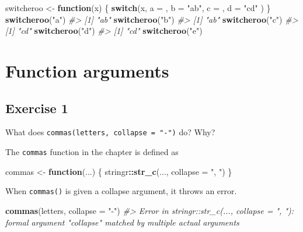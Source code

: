 \documentclass[]{book}
\newenvironment{Shaded}{\begin{snugshade}}{\end{snugshade}}
\newcommand{\CommentTok}[1]{\textcolor[rgb]{0.56,0.35,0.01}{\textit{#1}}}
\newcommand{\ControlFlowTok}[1]{\textcolor[rgb]{0.13,0.29,0.53}{\textbf{#1}}}
\newcommand{\DataTypeTok}[1]{\textcolor[rgb]{0.13,0.29,0.53}{#1}}
\newcommand{\KeywordTok}[1]{\textcolor[rgb]{0.13,0.29,0.53}{\textbf{#1}}}
\newcommand{\NormalTok}[1]{#1}
\newcommand{\OperatorTok}[1]{\textcolor[rgb]{0.81,0.36,0.00}{\textbf{#1}}}
\newcommand{\StringTok}[1]{\textcolor[rgb]{0.31,0.60,0.02}{#1}}
\theoremstyle{plain}
\theoremstyle{remark}
\theoremstyle{definition}
\theoremstyle{definition}
\theoremstyle{definition}
\theoremstyle{remark}
\begin{document}
\begin{Shaded}
\begin{Highlighting}[]
\NormalTok{switcheroo <-}\StringTok{ }\ControlFlowTok{function}\NormalTok{(x) \{}
  \ControlFlowTok{switch}\NormalTok{(x,}
  \DataTypeTok{a =}\NormalTok{ ,}
  \DataTypeTok{b =} \StringTok{"ab"}\NormalTok{,}
  \DataTypeTok{c =}\NormalTok{ ,}
  \DataTypeTok{d =} \StringTok{"cd"}
\NormalTok{  )}
\NormalTok{\}}
\KeywordTok{switcheroo}\NormalTok{(}\StringTok{"a"}\NormalTok{)}
\CommentTok{#> [1] "ab"}
\KeywordTok{switcheroo}\NormalTok{(}\StringTok{"b"}\NormalTok{)}
\CommentTok{#> [1] "ab"}
\KeywordTok{switcheroo}\NormalTok{(}\StringTok{"c"}\NormalTok{)}
\CommentTok{#> [1] "cd"}
\KeywordTok{switcheroo}\NormalTok{(}\StringTok{"d"}\NormalTok{)}
\CommentTok{#> [1] "cd"}
\KeywordTok{switcheroo}\NormalTok{(}\StringTok{"e"}\NormalTok{)}
\end{Highlighting}
\end{Shaded}

\hypertarget{function-arguments}{%
\section{Function arguments}\label{function-arguments}}

\hypertarget{exercise-1-52}{%
\subsection{Exercise 1}\label{exercise-1-52}}

What does \texttt{commas(letters,\ collapse\ =\ "-")} do? Why?

The \texttt{commas} function in the chapter is defined as

\begin{Shaded}
\begin{Highlighting}[]
\NormalTok{commas <-}\StringTok{ }\ControlFlowTok{function}\NormalTok{(...) \{}
\NormalTok{  stringr}\OperatorTok{::}\KeywordTok{str_c}\NormalTok{(..., }\DataTypeTok{collapse =} \StringTok{", "}\NormalTok{)}
\NormalTok{\}}
\end{Highlighting}
\end{Shaded}

When \texttt{commas()} is given a collapse argument, it throws an error.

\begin{Shaded}
\begin{Highlighting}[]
\KeywordTok{commas}\NormalTok{(letters, }\DataTypeTok{collapse =} \StringTok{"-"}\NormalTok{)}
\CommentTok{#> Error in stringr::str_c(..., collapse = ", "): formal argument "collapse" matched by multiple actual arguments}
\end{Highlighting}
\end{Shaded}
\end{document}
